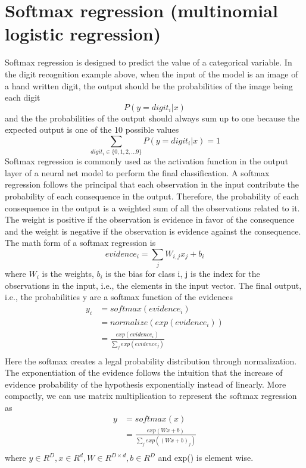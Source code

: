 \section{Softmax regression (multinomial logistic regression)}
Softmax regression is designed to predict the value of a categorical variable.
In the digit recognition example above, when the input of the model is an image of a hand written digit, the output should be the probabilities of the image being each digit
\[P(y = digit_i | x)\]
and the the probabilities of the output should always sum up to one because the expected output is one of the 10 possible values
\[ \sum_{digit_i \in \{0, 1, 2, ... 9\}}P(y = digit_i | x) = 1 \]
Softmax regression is commonly used as the activation function in the output layer of a neural net model to perform the final classification.
A softmax regression follows the principal that each observation in the input contribute the probability of each consequence in the output. Therefore, the probability of each consequence in the output is a weighted sum of all the observations related to it. The weight is positive if the observation is evidence in favor of the consequence and the weight is negative if the observation is evidence against the consequence.
The math form of a softmax regression is
\[ evidence_i = \sum_j W_{i, j} x_j + b_i \]
where $ W_i $ is the weights, $ b_i $ is the bias for class i, j is the index for the observations in the input, i.e., the elements in the input vector.
The final output, i.e., the probabilities y are a softmax function of the evidences
\begin{align*}
	y_i
	&= softmax(evidence_i) \\
	&= normalize(exp(evidence_i)) \\
	&= \frac{exp(evidence_i)}{\sum_j exp(evidence_j)} \\
\end{align*}
Here the softmax creates a legal probability distribution through normalization. The exponentiation of the evidence follows the intuition that the increase of evidence probability of the hypothesis exponentially instead of linearly.
More compactly, we can use matrix multiplication to represent the softmax regression as
\begin{align*}
	y
	&= softmax(x) \\
	&= \frac{exp(Wx + b)}{\sum_j exp((Wx + b)_j)} \\
\end{align*}
where $ y \in R^D, x \in R^d, W \in R^{D \times d}, b \in R^D $ and exp() is element wise.
